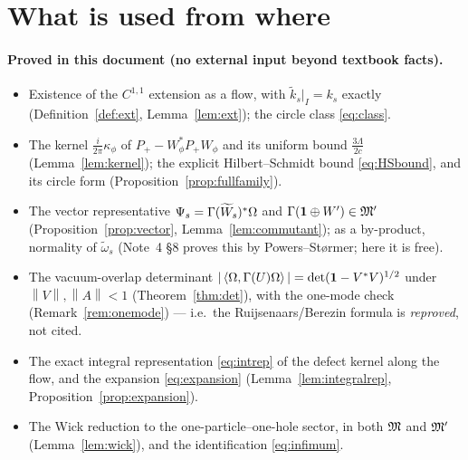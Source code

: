 \documentclass[11pt]{article}
\newcommand{\Pp}{P_+}\newcommand{\Pm}{P_-}
\newcommand{\Wt}{\widetilde W}\newcommand{\kt}{\widetilde k}
\newcommand{\Gm}{\Gamma}
\newcommand{\norm}[1]{\left\lVert #1\right\rVert}\newcommand{\abs}[1]{\left|#1\right|}
\newcommand{\ip}[2]{\left\langle #1,#2\right\rangle}\newcommand{\one}{\mathbf 1}
\begin{document}
\section{What is used from where}\label{sec:used}

\paragraph{Proved in this document (no external input beyond textbook facts).}
\begin{itemize}[leftmargin=1.4em]
\item Existence of the $C^{1,1}$ extension as a flow, with $\kt_s|_I=k_s$ exactly
 (Definition~\ref{def:ext}, Lemma~\ref{lem:ext}); the circle class \eqref{eq:class}.
\item The kernel $\frac i{2\pi}\kappa_\phi$ of $\Pp-W_\phi^*\Pp W_\phi$ and its uniform bound
 $\frac{3\Lambda}{2c}$ (Lemma~\ref{lem:kernel}); the explicit Hilbert--Schmidt bound
 \eqref{eq:HSbound}, and its circle form (Proposition~\ref{prop:fullfamily}).
\item The vector representative $\Psi_s=\Gm(\Wt_s)^*\Om$ and $\Gm(\one\oplus W')\in\cM'$
 (Proposition~\ref{prop:vector}, Lemma~\ref{lem:commutant}); as a by-product, normality of
 $\widetilde\omega_s$ (Note~4 \S8 proves this by Powers--St\o rmer; here it is free).
\item The vacuum-overlap determinant $|\ip\Om{\Gm(U)\Om}|=\det(\one-V^*V)^{1/2}$ under
 $\norm V,\norm A<1$ (Theorem~\ref{thm:det}), with the one-mode check
 (Remark~\ref{rem:onemode}) --- i.e.\ the Ruijsenaars/Berezin formula is \emph{reproved}, not cited.
\item The exact integral representation \eqref{eq:intrep} of the defect kernel along the flow, and
 the expansion \eqref{eq:expansion} (Lemma~\ref{lem:integralrep},
 Proposition~\ref{prop:expansion}).
\item The Wick reduction to the one-particle--one-hole sector, in both $\mathfrak M$ and $\mathfrak M'$
 (Lemma~\ref{lem:wick}), and the identification \eqref{eq:infimum}.
\end{itemize}
\end{document}
